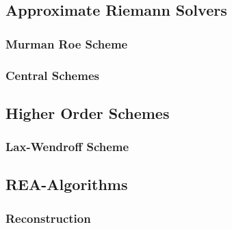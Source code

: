\documentclass[
  fourColumns,
  landscape
]{formularyETH/formularyETH}
\begin{document}
  \subsection{Approximate Riemann Solvers}\label{subsec:approximate_riemann_solvers}
    
    \subsubsection{Murman Roe Scheme}\label{subsubsec:roes_scheme}
      
    \subsubsection{Central Schemes}\label{subsubsec:central_schemes}
      
      \label{subsubsubsec:lax-friedrichs_scheme}
        
      \label{subsubsubsec:rusanov_scheme}
        
      \label{subsubsubsec:enquist-osher_flux}
        
  \vfill\columnbreak
  \subsection{Higher Order Schemes}\label{subsec:higher_order_schemes}
    
    \subsubsection{Lax-Wendroff Scheme\hfill{}}\label{subsubsec:lax-wendroff_scheme}
      
    \subsection{REA-Algorithms}\label{subsec:rea}
      \subsubsection{Reconstruction}\label{subsec:reconstruction}
        
\end{document}
